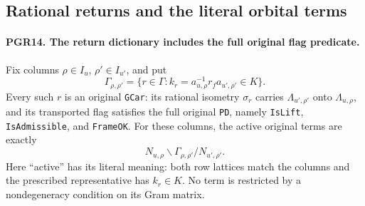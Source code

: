 \subsection{Rational returns and the literal orbital terms}

\paragraph{PGR14. The return dictionary includes the full original flag predicate.}
\label{claim:PGR14}
Fix columns \(\rho\in I_u\), \(\rho'\in I_{u'}\), and put
\[
 \Gamma_{\rho,\rho'}=
 \{r\in\Gamma:k_r=a_{u,\rho}^{-1}r_fa_{u',\rho'}\in K\}.
\tag{PGR.33}
\]
Every such \(r\) is an original \texttt{GCar}: its rational
isometry \(\sigma_r\) carries \(\Lambda_{u',\rho'}\)
onto \(\Lambda_{u,\rho}\), and its transported flag satisfies
the full original \texttt{PD}, namely \texttt{IsLift},
\texttt{IsAdmissible}, and \texttt{FrameOK}.  For these columns,
the active original terms are exactly
\[
       N_{u,\rho}\backslash
                 \Gamma_{\rho,\rho'}/N_{u',\rho'}.
\tag{PGR.34}
\]
Here ``active'' has its literal meaning: both row lattices match the
columns and the prescribed representative has \(k_r\in K\).
No term is restricted by a nondegeneracy condition on its Gram matrix.
